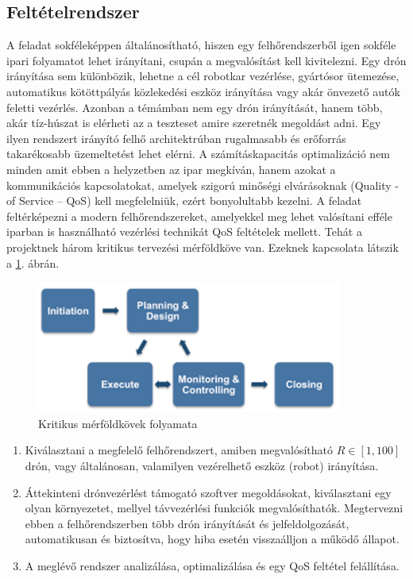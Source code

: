\subsection{Feltételrendszer}
A feladat sokféleképpen általánosítható, hiszen egy felhőrendszerből igen sokféle ipari folyamatot lehet irányítani, csupán a megvalósítást kell kivitelezni. Egy drón irányítása sem különbözik, lehetne a cél robotkar vezérlése, gyártósor ütemezése, automatikus kötöttpályás közlekedési eszköz irányítása vagy akár önvezető autók feletti vezérlés.
 Azonban a témámban nem egy drón irányítását, hanem több, akár tíz-húszat is elérheti az a teszteset amire szeretnék megoldást adni. Egy ilyen rendszert irányító felhő architektrúban rugalmasabb és erőforrás takarékosabb üzemeltetést lehet elérni. A számításkapacitás optimalizáció nem minden amit ebben a helyzetben az ipar megkíván, hanem azokat a kommunikációs kapcsolatokat, amelyek szigorú minőségi elvárásoknak (Quality -of Service – QoS) kell megfelelniük, ezért bonyolultabb kezelni. A feladat feltérképezni a modern felhőrendszereket, amelyekkel meg lehet valósítani efféle iparban is használható vezérlési technikát QoS feltételek mellett. Tehát a projektnek három kritikus tervezési mérföldköve van. Ezeknek kapcsolata látszik a \ref{fig:merfold}. ábrán.
\begin{figure}
	\centering
	\includegraphics[width=10cm]{figures/plan_excecute_monitor.png}
	\caption{Kritikus mérföldkövek folyamata \cite{ProjecPlan}}
	\label{fig:merfold}
\end{figure}
\begin{enumerate}
	\item Kiválasztani a megfelelő felhőrendszert, amiben megvalósítható $R\in [1, 100]$ drón, vagy általánosan, valamilyen vezérelhető eszköz (robot) irányítása.
	\item Áttekinteni drónvezérlést támogató szoftver megoldásokat, kiválasztani egy olyan környezetet, mellyel távvezérlési funkciók megvalósíthatók. Megtervezni ebben a felhőrendszerben több drón irányítását és jelfeldolgozását, automatikusan és biztosítva, hogy hiba esetén visszaálljon a működő állapot.
	\item A meglévő rendszer analizálása, optimalizálása és egy QoS feltétel felállítása.
\end{enumerate}


